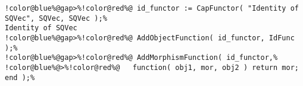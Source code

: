 \begin{Verbatim}[commandchars=!@\%,frame=single]
!color@blue%@gap>%!color@red%@ id_functor := CapFunctor( "Identity of SQVec", SQVec, SQVec );%
Identity of SQVec
!color@blue%@gap>%!color@red%@ AddObjectFunction( id_functor, IdFunc );%
!color@blue%@gap>%!color@red%@ AddMorphismFunction( id_functor,%
!color@blue%@>%!color@red%@   function( obj1, mor, obj2 ) return mor; end );%
\end{Verbatim}
